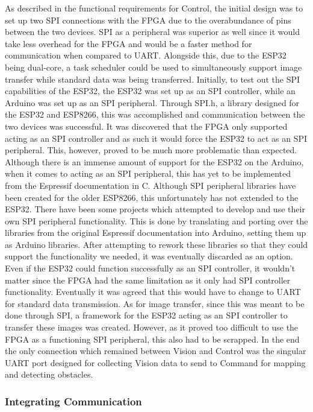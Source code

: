 \documentclass[a4paper]{article}
\begin{document}
As described in the functional requirements for Control, the initial 
design was to set up two SPI connections with the FPGA due to the 
overabundance of pins between the two devices. SPI as a peripheral was 
superior as well since it would take less overhead for the FPGA and 
would be a faster method for communication when compared to UART. 
Alongside this, due to the ESP32 being dual-core, a task scheduler could 
be used to simultaneously support image transfer while standard data was 
being transferred. Initially, to test out the SPI capabilities of the 
ESP32, the ESP32 was set up as an SPI controller, while an Arduino was set 
up as an SPI peripheral. Through SPI.h, a library designed for the ESP32 
and ESP8266, this was accomplished and communication between the two 
devices was successful. It was discovered that the FPGA only supported 
acting as an SPI controller and as such it would force the ESP32 to act 
as an SPI peripheral. This, however, proved to be much more problematic 
than expected. Although there is an immense amount of support for the 
ESP32 on the Arduino, when it comes to acting as an SPI peripheral, this 
has yet to be implemented from the Espressif documentation in C. Although 
SPI peripheral libraries have been created for the older ESP8266, this 
unfortunately has not extended to the ESP32. There have been some projects 
which attempted to develop and use their own SPI peripheral functionality. 
This is done by translating and porting over the libraries from the 
original Espressif documentation into Arduino, setting them up as Arduino 
libraries. After attempting to rework these libraries so that they could 
support the functionality we needed, it was eventually discarded as an 
option. Even if the ESP32 could function successfully as an SPI 
controller, it wouldn’t matter since the FPGA had the same limitation 
as it only had SPI controller functionality. Eventually it was agreed 
that this would have to change to UART for standard data transmission. 
As for image transfer, since this was meant to be done through SPI, a 
framework for the ESP32 acting as an SPI controller to transfer these 
images was created. However, as it proved too difficult to use the FPGA 
as a functioning SPI peripheral, this also had to be scrapped. In the 
end the only connection which remained between Vision and Control was 
the singular UART port designed for collecting Vision data to send to 
Command for mapping and detecting obstacles.

\subsubsection{Integrating Communication}
 
\end{document}
